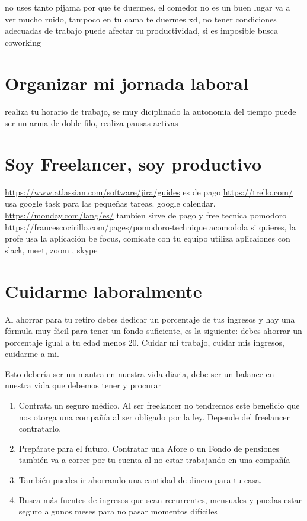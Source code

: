 \documentclass{article}
\begin{document}
no uses tanto pijama por que te duermes, el comedor no es un buen lugar va a ver mucho ruido, tampoco en tu cama te duermes xd, no tener condiciones adecuadas de trabajo puede afectar tu productividad, si es imposible busca coworking 

\section{Organizar mi jornada laboral}

realiza tu horario de trabajo, se muy diciplinado la autonomia del tiempo puede ser un arma de doble filo, realiza pausas activas

\section{Soy Freelancer, soy productivo}
\url{https://www.atlassian.com/software/jira/guides} es de pago
\url{https://trello.com/}
usa google task para las pequeñas tareas.
google calendar.
\url{https://monday.com/lang/es/} tambien sirve de pago y free
tecnica pomodoro \url{https://francescocirillo.com/pages/pomodoro-technique} acomodola si quieres, la profe usa la aplicación be focus, comicate con tu equipo utiliza aplicaiones con slack, meet, zoom , skype

\section{Cuidarme laboralmente}

Al ahorrar para tu retiro debes dedicar un porcentaje de tus ingresos y hay una fórmula muy fácil para tener un fondo suficiente, es la siguiente: debes ahorrar un porcentaje igual a tu edad menos 20.
Cuidar mi trabajo, cuidar mis ingresos, cuidarme a mi.

Esto debería ser un mantra en nuestra vida diaria, debe ser un balance en nuestra vida que debemos tener y procurar
\begin{enumerate}
    \item Contrata un seguro médico. Al ser freelancer no tendremos este beneficio que nos otorga una compañía al ser obligado por la ley. Depende del freelancer contratarlo.
    \item Prepárate para el futuro. Contratar una Afore o un Fondo de pensiones también va a correr por tu cuenta al no estar trabajando en una compañía
    \item También puedes ir ahorrando una cantidad de dinero para tu casa.
    \item Busca más fuentes de ingresos que sean recurrentes, mensuales y puedas estar seguro algunos meses para no pasar momentos difíciles
\end{enumerate}
\end{document}
